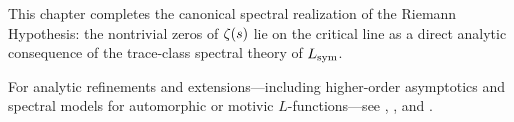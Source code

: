 \medskip

\noindent
This chapter completes the canonical spectral realization of the Riemann Hypothesis: the nontrivial zeros of \( \zeta(s) \) lie on the critical line as a direct analytic consequence of the trace-class spectral theory of \( L_{\mathrm{sym}} \).

\medskip

\noindent
For analytic refinements and extensions—including higher-order asymptotics and spectral models for automorphic or motivic \( L \)-functions—see , , and .
